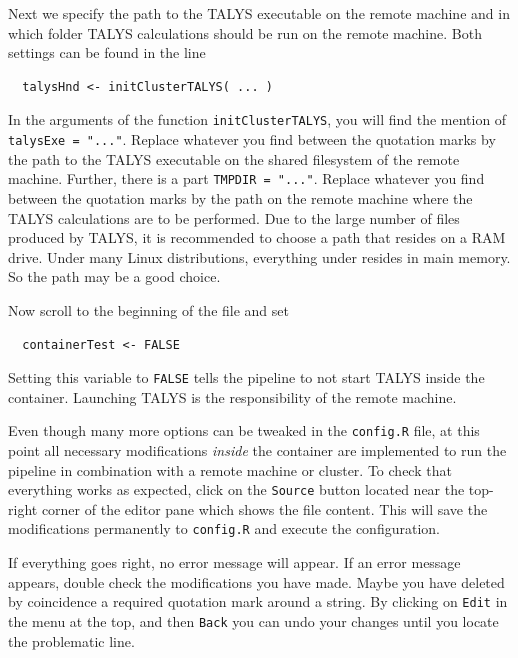 \documentclass[12pt,a4paper]{scrartcl}
\begin{document}
Next we specify the path to the TALYS executable on the remote machine and in which folder TALYS calculations should be run on the remote machine.
Both settings can be found in the line
\begin{verbatim}
  talysHnd <- initClusterTALYS( ... )  
\end{verbatim}
In the arguments of the function \verb|initClusterTALYS|, you will find the mention of \verb|talysExe = "..."|.
Replace whatever you find between the quotation marks by the path to the TALYS executable on the shared filesystem of the remote machine.
Further, there is a part \verb|TMPDIR = "..."|. 
Replace whatever you find between the quotation marks by the path on the remote machine where the TALYS calculations are to be performed.
Due to the large number of files produced by TALYS, it is recommended to choose a path that resides on a RAM drive.
Under many Linux distributions, everything under  resides in main memory.
So the path  may be a good choice.

Now scroll to the beginning of the file and set
\begin{verbatim}
  containerTest <- FALSE
\end{verbatim}
Setting this variable to \verb|FALSE| tells the pipeline to not start TALYS inside the container.
Launching TALYS is the responsibility of the remote machine.

Even though many more options can be tweaked in the \verb|config.R| file, at this point all necessary modifications \textit{inside} the container are implemented to run the pipeline in combination with a remote machine or cluster.
To check that everything works as expected, click on the \verb|Source| button located near the top-right corner of the editor pane which shows the file content.
This will save the modifications permanently to \verb|config.R| and execute the configuration.

If everything goes right, no error message will appear.
If an error message appears, double check the modifications you have made.
Maybe you have deleted by coincidence a required quotation mark around a string.
By clicking on \verb|Edit| in the menu at the top, and then \verb|Back| you can undo your changes until you locate the problematic line.
\end{document}
